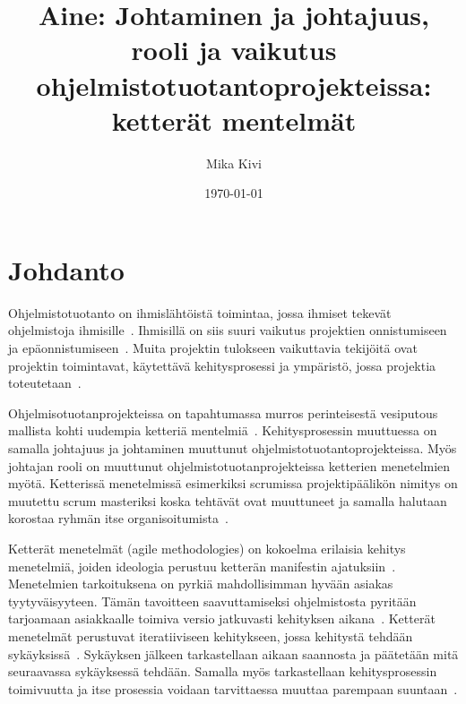 \documentclass[finnish]{tktltiki2}
\title{Aine: Johtaminen ja johtajuus, rooli ja vaikutus ohjelmistotuotantoprojekteissa: ketterät mentelmät}
\author{Mika Kivi}
\date{\today}
\theoremstyle{definition}
\theoremstyle{remark}
\begin{document}

\maketitle        %
\makeabstract     %

\tableofcontents  %
\newpage          %



\section{Johdanto}


Ohjelmistotuotanto on ihmislähtöistä toimintaa, jossa ihmiset tekevät ohjelmistoja ihmisille~\cite{Wang:2010:PPP:1810295.1810302}. Ihmisillä on siis suuri vaikutus projektien onnistumiseen ja epäonnistumiseen~\cite{Wang:2009:PMP:1639950.1640049}. Muita projektin tulokseen vaikuttavia tekijöitä ovat projektin toimintavat, käytettävä kehitysprosessi ja ympäristö, jossa projektia toteutetaan~\cite{McLeod:2011:FAS:1978802.1978803}.

Ohjelmisotuotanprojekteissa on tapahtumassa murros perinteisestä vesiputous mallista kohti uudempia ketteriä mentelmiä~\cite{Chow2008961}. Kehitysprosessin muuttuessa on samalla johtajuus ja johtaminen muuttunut ohjelmistotuotantoprojekteissa. Myös johtajan rooli on muuttunut ohjelmistotuotanprojekteissa ketterien menetelmien myötä. Ketterissä menetelmissä esimerkiksi scrumissa projektipäälikön nimitys on muutettu scrum masteriksi koska tehtävät ovat muuttuneet ja samalla halutaan korostaa ryhmän itse organisoitumista~\cite{4755768}. 

Ketterät menetelmät (agile methodologies) on kokoelma erilaisia kehitys menetelmiä, joiden ideologia perustuu ketterän manifestin ajatuksiin~\cite{fowler2001agile}. Menetelmien tarkoituksena on pyrkiä mahdollisimman hyvään asiakas tyytyväisyyteen. Tämän tavoitteen saavuttamiseksi ohjelmistosta pyritään tarjoamaan asiakkaalle toimiva versio jatkuvasti kehityksen aikana~\cite{fowler2001agile}. Ketterät menetelmät perustuvat iteratiiviseen kehitykseen, jossa kehitystä tehdään sykäyksissä~\cite{cohen2004introduction}. Sykäyksen jälkeen tarkastellaan aikaan saannosta ja päätetään mitä seuraavassa sykäyksessä tehdään. Samalla myös tarkastellaan kehitysprosessin toimivuutta ja itse prosessia voidaan tarvittaessa muuttaa parempaan suuntaan~\cite{cohen2004introduction}. 
\end{document}
